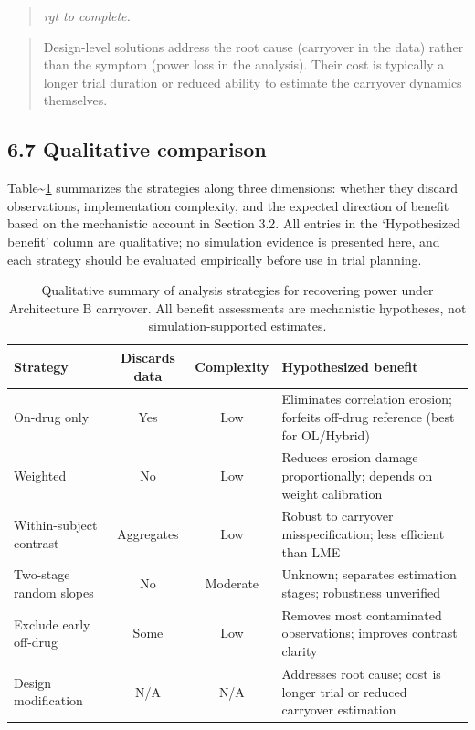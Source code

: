 \documentclass[
  11pt,
]{article}
\newenvironment{rgt}{%
  \begin{quote}\small\itshape\color[RGB]{20,60,160}}{%
  \end{quote}}
\newenvironment{orig}{%
  \begin{quote}\normalsize\color[gray]{0.55}}{%
  \end{quote}}
\begin{document}
\begin{rgt}
rgt to complete.

\end{rgt}

\begin{orig}
Design-level solutions address the root cause (carryover in the data)
rather than the symptom (power loss in the analysis). Their cost is
typically a longer trial duration or reduced ability to estimate the
carryover dynamics themselves.

\end{orig}

\subsection{6.7 Qualitative comparison}

Table\textasciitilde{}\ref{tab:sec6-strategies} summarizes the
strategies along three dimensions: whether they discard observations,
implementation complexity, and the expected direction of benefit based
on the mechanistic account in Section 3.2. All entries in the
`Hypothesized benefit' column are qualitative; no simulation evidence is
presented here, and each strategy should be evaluated empirically before
use in trial planning.

\begin{table}[htbp]
\centering
\caption{Qualitative summary of analysis strategies for
recovering power under Architecture B carryover. All benefit
assessments are mechanistic hypotheses, not simulation-supported
estimates.}
\label{tab:sec6-strategies}
\begin{tabular}{lccp{5cm}}
\toprule
Strategy & Discards data & Complexity & Hypothesized benefit \\
\midrule
On-drug only & Yes & Low & Eliminates correlation erosion;
  forfeits off-drug reference (best for OL/Hybrid) \\
Weighted & No & Low & Reduces erosion damage proportionally;
  depends on weight calibration \\
Within-subject contrast & Aggregates & Low & Robust to
  carryover misspecification; less efficient than LME \\
Two-stage random slopes & No & Moderate & Unknown; separates
  estimation stages; robustness unverified \\
Exclude early off-drug & Some & Low & Removes most contaminated
  observations; improves contrast clarity \\
Design modification & N/A & N/A & Addresses root cause;
  cost is longer trial or reduced carryover estimation \\
\bottomrule
\end{tabular}
\end{table}
\end{document}
